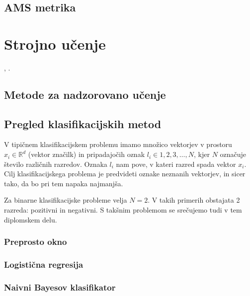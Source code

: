 \documentclass[11pt,a4paper,openany]{book}
\begin{document}
\section{AMS metrika}

\chapter{Strojno učenje}

\cite{Mitchell1997}, \cite{Witten2005}.

\section{Metode za nadzorovano učenje}

\section{Pregled klasifikacijskih metod}

V tipičnem klasifikacijskem problemu imamo množico vektorjev v prostoru $x_i \in \mathbb{R}^d$ (vektor značilk) in pripadajočih oznak $l_i \in {1, 2, 3, \ldots, N}$, kjer $N$ označuje število različnih razredov. Oznaka $l_i$ nam pove, v kateri razred spada vektor $x_i$. Cilj klasifikacijskega problema je predvideti oznake neznanih vektorjev, in sicer tako, da bo pri tem napaka najmanjša.

Za binarne klasifikacijske probleme velja $N = 2$. V takih primerih obstajata 2 razreda: pozitivni in negativni. S takšnim problemom se srečujemo tudi v tem diplomskem delu.



\subsection{Preprosto okno}

\subsection{Logistična regresija}

\subsection{Naivni Bayesov klasifikator}
\end{document}
